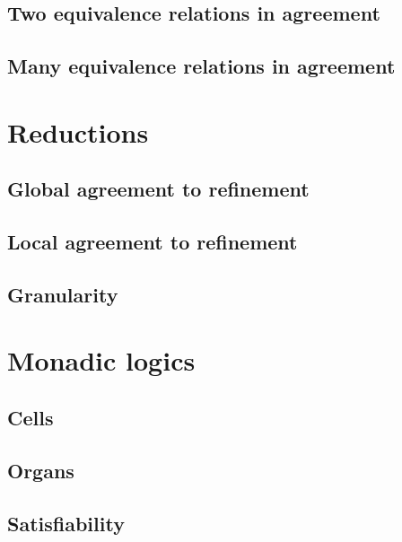 \documentclass{scrbook}
\begin{document}
\section{Two equivalence relations in agreement}


\section{Many equivalence relations in agreement}



\chapter{Reductions}\label{ch:reductions}


\section{Global agreement to refinement}


\section{Local agreement to refinement}


\section{Granularity}\label{sec:granularity}



\chapter{Monadic logics}\label{ch:monadic}


\section{Cells}


\section{Organs}


\section{Satisfiability}

\end{document}
